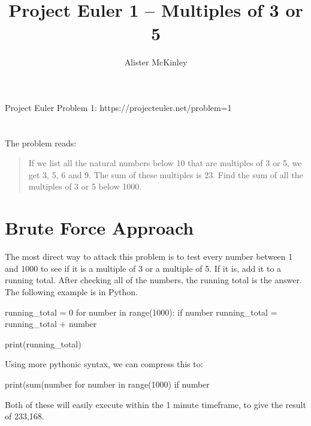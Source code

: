 \documentclass{article}
\title{Project Euler 1 – Multiples of 3 or 5}
\author{Alister McKinley}
\date{}
\begin{document}
\maketitle


Project Euler Problem 1: https://projecteuler.net/problem=1

\section*{}
The problem reads:

\begin{quote}
    If we list all the natural numbers below 10 that are multiples of 3 or 5,
    we get 3, 5, 6 and 9. The sum of these multiples is 23. Find the sum of all
    the multiples of 3 or 5 below 1000.
\end{quote}

\section*{Brute Force Approach}
The most direct way to attack this problem is to test every number between 1
and 1000 to see if it is a multiple of 3 or a multiple of 5. If it is, add it
to a running total. After checking all of the numbers, the running total is the
answer. The following example is in Python.

\begin{pyverbatim}[][frame=single]
running_total = 0
for number in range(1000):
    if number %
        running_total = running_total + number

print(running_total)
\end{pyverbatim}

Using more pythonic syntax, we can compress this to:

\begin{pyverbatim}[][frame=single]
print(sum(number for number in range(1000)
          if number %
\end{pyverbatim}

Both of these will easily execute within the 1 minute timeframe, to give the
result of 233,168.
\end{document}
